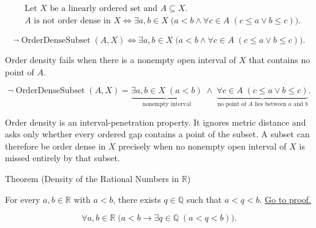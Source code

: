 \begin{remark*}
\[
\begin{aligned}
&\text{Let }X\text{ be a linearly ordered set and }A\subseteq X.\\
&A\text{ is not order dense in }X
\Longleftrightarrow
\exists a,b\in X\;\bigl(a<b\land \forall c\in A\;(c\le a\lor b\le c)\bigr).
\end{aligned}
\]
\end{remark*}

\begin{remark*}
\[
\neg\operatorname{OrderDenseSubset}(A,X)\Longleftrightarrow
\exists a,b\in X\;\bigl(a<b\land \forall c\in A\;(c\le a\lor b\le c)\bigr).
\]
\end{remark*}

\begin{remark*}
Order density fails when there is a nonempty open interval of $X$ that contains no point of $A$.
\end{remark*}

\begin{remark*}
\[
\neg\operatorname{OrderDenseSubset}(A,X)
=
\underbrace{\exists a,b\in X\;(a<b)}_{\text{nonempty interval}}
\;\land\;
\underbrace{\forall c\in A\;(c\le a\lor b\le c)}_{\text{no point of }A\text{ lies between }a\text{ and }b}.
\]
\end{remark*}

\begin{remark*}[Interpretation]
Order density is an interval-penetration property. It ignores metric distance and asks only whether every ordered gap contains a point of the subset. A subset can therefore be order dense in $X$ precisely when no nonempty open interval of $X$ is missed entirely by that subset.
\end{remark*}

\NoLocalDependencies
\begin{theorembox}{Theorem (Density of the Rational Numbers in $\mathbb{R}$)}
\begin{theorem}
\label{thm:density-of-rationals-in-reals}
For every $a,b\in\mathbb{R}$ with $a<b$, there exists $q\in\mathbb{Q}$ such that $a<q<b$.
\hyperref[prf:density-of-rationals-in-reals]{Go to proof.}
\end{theorem}
\end{theorembox}

\begin{remark*}
\[
\forall a,b\in\mathbb{R}\;\bigl(a<b\rightarrow \exists q\in\mathbb{Q}\;(a<q<b)\bigr).
\]
\end{remark*}


